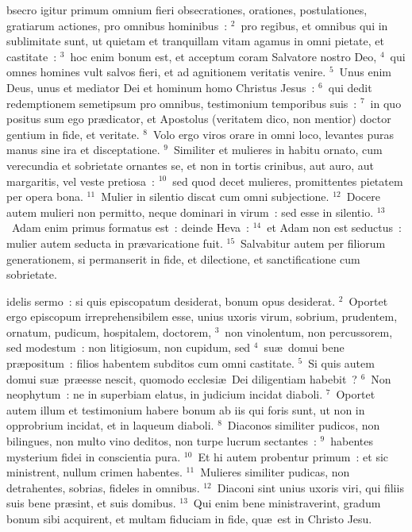 \bchapter
{}bsecro igitur primum omnium fieri obsecrationes, orationes, postulationes, gratiarum actiones, pro omnibus hominibus~:
${}^{2}$~pro regibus, et omnibus qui in sublimitate sunt, ut quietam et tranquillam vitam agamus in omni pietate, et castitate~:
${}^{3}$~hoc enim bonum est, et acceptum coram Salvatore nostro Deo,
${}^{4}$~qui omnes homines vult salvos fieri, et ad agnitionem veritatis venire.
${}^{5}$~Unus enim Deus, unus et mediator Dei et hominum homo Christus Jesus~:
${}^{6}$~qui dedit redemptionem semetipsum pro omnibus, testimonium temporibus suis~:
${}^{7}$~in quo positus sum ego pr\ae dicator, et Apostolus (veritatem dico, non mentior) doctor gentium in fide, et veritate.
${}^{8}$~Volo ergo viros orare in omni loco, levantes puras manus sine ira et disceptatione.
${}^{9}$~Similiter et mulieres in habitu ornato, cum verecundia et sobrietate ornantes se, et non in tortis crinibus, aut auro, aut margaritis, vel veste pretiosa~:
${}^{10}$~sed quod decet mulieres, promittentes pietatem per opera bona.
${}^{11}$~Mulier in silentio discat cum omni subjectione.
${}^{12}$~Docere autem mulieri non permitto, neque dominari in virum~: sed esse in silentio.
${}^{13}$~Adam enim primus formatus est~: deinde Heva~:
${}^{14}$~et Adam non est seductus~: mulier autem seducta in pr\ae varicatione fuit.
${}^{15}$~Salvabitur autem per filiorum generationem, si permanserit in fide, et dilectione, et sanctificatione cum sobrietate.

\bchapter
{}idelis sermo~: si quis episcopatum desiderat, bonum opus desiderat.
${}^{2}$~Oportet ergo episcopum irreprehensibilem esse, unius uxoris virum, sobrium, prudentem, ornatum, pudicum, hospitalem, doctorem,
${}^{3}$~non vinolentum, non percussorem, sed modestum~: non litigiosum, non cupidum, sed
${}^{4}$~su\ae\ domui bene pr\ae positum~: filios habentem subditos cum omni castitate.
${}^{5}$~Si quis autem domui su\ae\ pr\ae esse nescit, quomodo ecclesi\ae\ Dei diligentiam habebit~?
${}^{6}$~Non neophytum~: ne in superbiam elatus, in judicium incidat diaboli.
${}^{7}$~Oportet autem illum et testimonium habere bonum ab iis qui foris sunt, ut non in opprobrium incidat, et in laqueum diaboli.
${}^{8}$~Diaconos similiter pudicos, non bilingues, non multo vino deditos, non turpe lucrum sectantes~:
${}^{9}$~habentes mysterium fidei in conscientia pura.
${}^{10}$~Et hi autem probentur primum~: et sic ministrent, nullum crimen habentes.
${}^{11}$~Mulieres similiter pudicas, non detrahentes, sobrias, fideles in omnibus.
${}^{12}$~Diaconi sint unius uxoris viri, qui filiis suis bene pr\ae sint, et suis domibus.
${}^{13}$~Qui enim bene ministraverint, gradum bonum sibi acquirent, et multam fiduciam in fide, qu\ae\ est in Christo Jesu.


